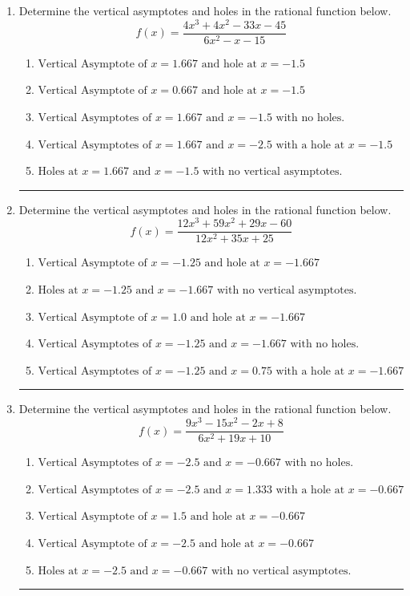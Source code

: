 \documentclass[14pt]{extbook}
\newcommand{\litem}[1]{\item#1\hspace*{-1cm}\rule{\textwidth}{0.4pt}}
\begin{document}
\begin{enumerate}
\litem{
Determine the vertical asymptotes and holes in the rational function below.\[ f(x) = \frac{4x^{3} +4 x^{2} -33 x -45}{6x^{2} -x -15} \]\begin{enumerate}[label=\Alph*.]
\item \( \text{Vertical Asymptote of } x = 1.667 \text{ and hole at } x = -1.5 \)
\item \( \text{Vertical Asymptote of } x = 0.667 \text{ and hole at } x = -1.5 \)
\item \( \text{Vertical Asymptotes of } x = 1.667 \text{ and } x = -1.5 \text{ with no holes.} \)
\item \( \text{Vertical Asymptotes of } x = 1.667 \text{ and } x = -2.5 \text{ with a hole at } x = -1.5 \)
\item \( \text{Holes at } x = 1.667 \text{ and } x = -1.5 \text{ with no vertical asymptotes.} \)

\end{enumerate} }
\litem{
Determine the vertical asymptotes and holes in the rational function below.\[ f(x) = \frac{12x^{3} +59 x^{2} +29 x -60}{12x^{2} +35 x + 25} \]\begin{enumerate}[label=\Alph*.]
\item \( \text{Vertical Asymptote of } x = -1.25 \text{ and hole at } x = -1.667 \)
\item \( \text{Holes at } x = -1.25 \text{ and } x = -1.667 \text{ with no vertical asymptotes.} \)
\item \( \text{Vertical Asymptote of } x = 1.0 \text{ and hole at } x = -1.667 \)
\item \( \text{Vertical Asymptotes of } x = -1.25 \text{ and } x = -1.667 \text{ with no holes.} \)
\item \( \text{Vertical Asymptotes of } x = -1.25 \text{ and } x = 0.75 \text{ with a hole at } x = -1.667 \)

\end{enumerate} }
\litem{
Determine the vertical asymptotes and holes in the rational function below.\[ f(x) = \frac{9x^{3} -15 x^{2} -2 x + 8}{6x^{2} +19 x + 10} \]\begin{enumerate}[label=\Alph*.]
\item \( \text{Vertical Asymptotes of } x = -2.5 \text{ and } x = -0.667 \text{ with no holes.} \)
\item \( \text{Vertical Asymptotes of } x = -2.5 \text{ and } x = 1.333 \text{ with a hole at } x = -0.667 \)
\item \( \text{Vertical Asymptote of } x = 1.5 \text{ and hole at } x = -0.667 \)
\item \( \text{Vertical Asymptote of } x = -2.5 \text{ and hole at } x = -0.667 \)
\item \( \text{Holes at } x = -2.5 \text{ and } x = -0.667 \text{ with no vertical asymptotes.} \)


\end{enumerate}}
\end{enumerate}
\end{document}
